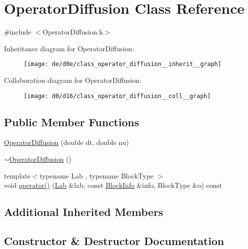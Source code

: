 \hypertarget{class_operator_diffusion}{}\section{Operator\+Diffusion Class Reference}
\label{class_operator_diffusion}


{\ttfamily \#include $<$Operator\+Diffusion.\+h$>$}



Inheritance diagram for Operator\+Diffusion\+:\nopagebreak
\begin{figure}[H]
\begin{center}
\leavevmode
\texttt{[image: de/d0e/class\_operator\_diffusion\_\_inherit\_\_graph]}
\end{center}
\end{figure}


Collaboration diagram for Operator\+Diffusion\+:\nopagebreak
\begin{figure}[H]
\begin{center}
\leavevmode
\texttt{[image: d0/d16/class\_operator\_diffusion\_\_coll\_\_graph]}
\end{center}
\end{figure}
\subsection*{Public Member Functions}
\begin{DoxyCompactItemize}
\item 
\hyperlink{class_operator_diffusion_a661c391953ea4ecab75d089124b4db24}{Operator\+Diffusion} (double dt, double nu)
\item 
\hyperlink{class_operator_diffusion_a32224246dc49919bb24dbb9798492c7d}{$\sim$\+Operator\+Diffusion} ()
\item 
{\footnotesize template$<$typename Lab , typename Block\+Type $>$ }\\void \hyperlink{class_operator_diffusion_a38cb92587b86ed70af0ea263e35fec0b}{operator()} (\hyperlink{_definitions_8h_ad6f951af9a2a6ebc1975404882b34314}{Lab} \&lab, const \hyperlink{struct_block_info}{Block\+Info} \&info, Block\+Type \&o) const 
\end{DoxyCompactItemize}
\subsection*{Additional Inherited Members}


\subsection{Constructor \& Destructor Documentation}
\hypertarget{class_operator_diffusion_a661c391953ea4ecab75d089124b4db24}{}
